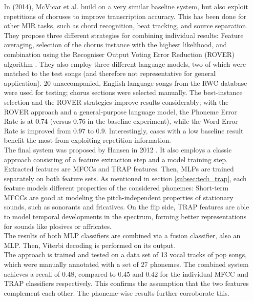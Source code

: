 In \cite{McVicar2014} (2014), McVicar et al. build on a very similar baseline system, but also exploit repetitions of choruses to improve transcription accuracy. This has been done for other MIR tasks, such as chord recognition, beat tracking, and source separation. They propose three different strategies for combining individual results: Feature averaging, selection of the chorus instance with the highest likelihood, and combination using the Recogniser Output Voting Error Reduction (ROVER) algorithm \cite{rover}. They also employ three different language models, two of which were matched to the test songs (and therefore not representative for general application). 20 unaccompanied, English-language songs from the RWC database \cite{rwc} were used for testing; chorus sections were selected manually. The best-instance selection and the ROVER strategies improve results considerably; with the ROVER approach and a general-purpose language model, the Phoneme Error Rate is at $0.74$ (versus $0.76$ in the baseline experiment), while the Word Error Rate is improved from $0.97$ to $0.9$. Interestingly, cases with a low baseline result benefit the most from exploiting repetition information.\\

The final system was proposed by Hansen in 2012 \cite{jens}. It also employs a classic approach consisting of a feature extraction step and a model training step. Extracted features are MFCCs and TRAP features. Then, MLPs are trained separately on both feature sets. As mentioned in section \ref{subsec:tech_trap}, each feature models different properties of the considered phonemes: Short-term MFCCs are good at modeling the pitch-independent properties of stationary sounds, such as sonorants and fricatives. On the flip side, TRAP features are able to model temporal developments in the spectrum, forming better representations for sounds like plosives or affricates.\\
The results of both MLP classifiers are combined via a fusion classifier, also an MLP. Then, Viterbi decoding is performed on its output.\\
The approach is trained and tested on a data set of 13 vocal tracks of pop songs, which were manually annotated with a set of 27 phonemes. The combined system achieves a recall of $0.48$, compared to $0.45$ and $0.42$ for the individual MFCC and TRAP classifiers respectively. This confirms the assumption that the two features complement each other. The phoneme-wise results further corroborate this.\\

